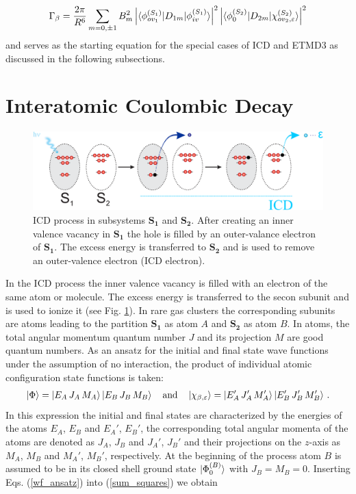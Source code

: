 \begin{align}
\label{sum_squares}
\Gamma_\beta
=  \frac{2\pi}{R^6}\sum\limits_{m=0,\pm 1}B_m^2 \left|
\braket{\phi_{ov_1}^{(S_1)}|{D}_{1m}|\phi_{iv}^{(S_1)}}\right|^2
\left|\braket{\phi_{0}^{(S_2)}|{D}_{2m}|\chi_{ov_2,\varepsilon}^{(S_2)}}\right|^2
\end{align}
and serves as the starting equation for the special cases of ICD and ETMD3
as discussed in the following subsections.

\section{Interatomic Coulombic Decay}
\label{subs_icd}

\begin{figure}[ht]
\centering
\includegraphics[scale=0.30]{pics/ICD_subsystems.eps}
\caption{ICD process in subsystems $\mathbf{S_1}$ and $\mathbf{S_2}$. After
         creating an inner valence vacancy in $\mathbf{S_1}$  the hole is filled
         by an outer-valance electron of $\mathbf{S_1}$. The excess energy is
         transferred to $\mathbf{S_2}$ and is used to remove an outer-valence
         electron (ICD electron).}
\label{fancy_ICD}
\end{figure}

In the ICD process the inner valence vacancy is filled with an electron
of the same atom or molecule. The excess energy is transferred to the secon
subunit and is used to ionize it (see Fig. \ref{fancy_ICD}). In rare gas
clusters the corresponding subunits are atoms leading to the partition
$\mathbf{S_1}$ as atom $A$ and $\mathbf{S_2}$ as atom $B$. In atoms,
the total angular momentum quantum number $J$ and its projection $M$ are
good quantum numbers. As an ansatz for the initial and final state wave
functions under the assumption of no interaction, the product of individual
atomic configuration state functions is taken:
\begin{equation}\label{wf_ansatz}
\ket{\Phi} =\ket{E_A\, J_A\, M_A}\ket{E_B\, J_B\, M_B}
\quad\mbox{and}\quad
\ket{\chi_{\beta,\varepsilon}} = \ket{E'_A\, J'_A\, M'_A}\ket{E'_B\,  J'_B\, M_B'}\, .
\end{equation}
In this expression the initial and final states are characterized by the
energies of the atoms $E_A$, $E_B$ and $E_A'$, $E_B'$, the corresponding
total angular momenta of the atoms are denoted as $J_A$, $J_B$ and
$J_A'$, $J_B'$ and their projections on the $z$-axis as $M_A$, $M_B$ and
$M_A'$, $M_B'$, respectively. At the beginning of the process atom $B$ is
assumed to be in its closed shell ground state $\ket{\Phi_0^{(B)}}$ with
$J_B=M_B=0$. Inserting Eqs. (\ref{wf_ansatz}) into (\ref{sum_squares})
we obtain

